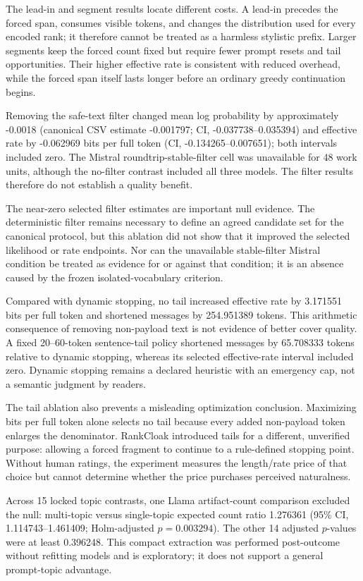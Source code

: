 \documentclass[fleqn,10pt]{wlscirep}
\begin{document}
The lead-in and segment results locate different costs. A lead-in precedes the forced span, consumes visible tokens, and changes the distribution used for every encoded rank; it therefore cannot be treated as a harmless stylistic prefix. Larger segments keep the forced count fixed but require fewer prompt resets and tail opportunities. Their higher effective rate is consistent with reduced overhead, while the forced span itself lasts longer before an ordinary greedy continuation begins.

Removing the safe-text filter changed mean log probability by approximately -0.0018 (canonical CSV estimate -0.001797; CI, -0.037738--0.035394) and effective rate by -0.062969 bits per full token (CI, -0.134265--0.007651); both intervals included zero. The Mistral roundtrip-stable-filter cell was unavailable for 48 work units, although the no-filter contrast included all three models. The filter results therefore do not establish a quality benefit.

The near-zero selected filter estimates are important null evidence. The deterministic filter remains necessary to define an agreed candidate set for the canonical protocol, but this ablation did not show that it improved the selected likelihood or rate endpoints. Nor can the unavailable stable-filter Mistral condition be treated as evidence for or against that condition; it is an absence caused by the frozen isolated-vocabulary criterion.

Compared with dynamic stopping, no tail increased effective rate by 3.171551 bits per full token and shortened messages by 254.951389 tokens. This arithmetic consequence of removing non-payload text is not evidence of better cover quality. A fixed 20--60-token sentence-tail policy shortened messages by 65.708333 tokens relative to dynamic stopping, whereas its selected effective-rate interval included zero. Dynamic stopping remains a declared heuristic with an emergency cap, not a semantic judgment by readers.

The tail ablation also prevents a misleading optimization conclusion. Maximizing bits per full token alone selects no tail because every added non-payload token enlarges the denominator. RankCloak introduced tails for a different, unverified purpose: allowing a forced fragment to continue to a rule-defined stopping point. Without human ratings, the experiment measures the length/rate price of that choice but cannot determine whether the price purchases perceived naturalness.

Across 15 locked topic contrasts, one Llama artifact-count comparison excluded the null: multi-topic versus single-topic expected count ratio 1.276361 (95\% CI, 1.114743--1.461409; Holm-adjusted \(p=0.003294\)). The other 14 adjusted \(p\)-values were at least 0.396248. This compact extraction was performed post-outcome without refitting models and is exploratory; it does not support a general prompt-topic advantage.
\end{document}
